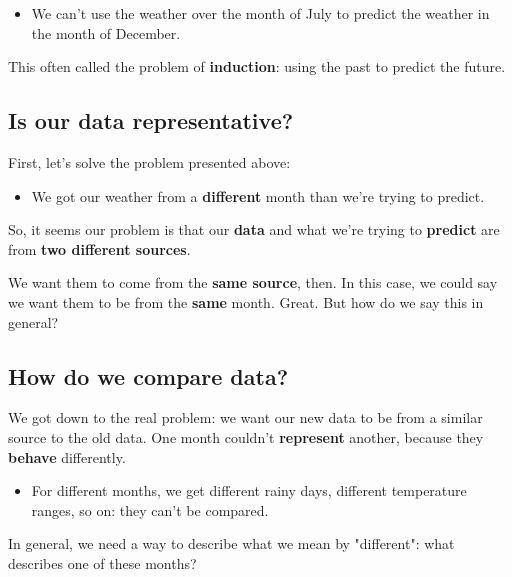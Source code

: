         \begin{itemize}
            \item \miniex We can't use the weather over the month of July to predict the weather in the month of December.
        \end{itemize}
        
        This often called the problem of \textbf{induction}: using the past to predict the future.
        
        
    \subsection{Is our data representative?}
    
        First, let's solve the problem presented above:
        
        \begin{itemize}
            \item \miniex We got our weather from a \textbf{different} month than we're trying to predict.
        \end{itemize} 
        
        So, it seems our problem is that our \textbf{data} and what we're trying to \textbf{predict} are from \textbf{two different sources}.
        
        We want them to come from the \textbf{same source}, then. In this case, we could say we want them to be from the \textbf{same} month. Great. But how do we say this in general?
        
    \subsection{How do we compare data?}
        
        We got down to the real problem: we want our new data to be from a similar source to the old data. One month couldn't \textbf{represent} another, because they \textbf{behave} differently.
        
        \begin{itemize}
            \item \miniex For different months, we get different rainy days, different temperature ranges, so on: they can't be compared.
        \end{itemize} 
        
        In general, we need a way to describe what we mean by "different": what describes one of these months?
        
